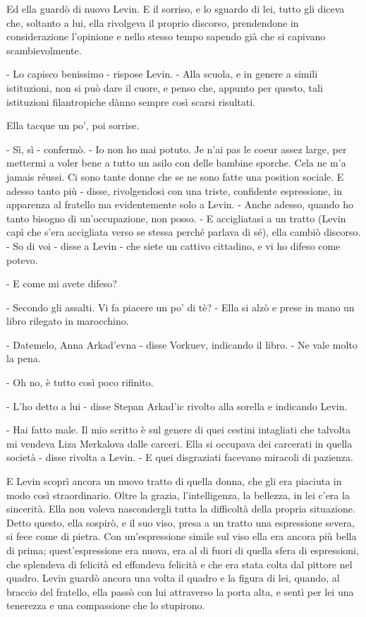 Ed ella guardò di nuovo Levin. E il sorriso, e lo sguardo di lei, tutto gli diceva che, soltanto a lui, ella rivolgeva il proprio discorso, prendendone in considerazione l'opinione e nello stesso tempo sapendo già che si capivano scambievolmente. 

- Lo capisco benissimo - rispose Levin. - Alla scuola, e in genere a simili istituzioni, non si può dare il cuore, e penso che, appunto per questo, tali istituzioni filantropiche dànno sempre così scarsi risultati. 

Ella tacque un po', poi sorrise. 

- Sì, sì - confermò. - Io non ho mai potuto. Je n'ai pas le coeur assez large, per mettermi a voler bene a tutto un asilo con delle bambine sporche. Cela ne m'a jamais réussi. Ci sono tante donne che se ne sono fatte una position sociale. E adesso tanto più - disse, rivolgendosi con una triste, confidente espressione, in apparenza al fratello ma evidentemente solo a Levin. - Anche adesso, quando ho tanto bisogno di un'occupazione, non posso. - E accigliatasi a un tratto (Levin capì che s'era accigliata verso se stessa perché parlava di sé), ella cambiò discorso. - So di voi - disse a Levin - che siete un cattivo cittadino, e vi ho difeso come potevo. 

- E come mi avete difeso? 

- Secondo gli assalti. Vi fa piacere un po' di tè? - Ella si alzò e prese in mano un libro rilegato in marocchino. 

- Datemelo, Anna Arkad'evna - disse Vorkuev, indicando il libro. - Ne vale molto la pena. 

- Oh no, è tutto così poco rifinito. 

- L'ho detto a lui - disse Stepan Arkad'ic rivolto alla sorella e indicando Levin. 

- Hai fatto male. Il mio scritto è sul genere di quei cestini intagliati che talvolta mi vendeva Liza Merkalova dalle carceri. Ella si occupava dei carcerati in quella società - disse rivolta a Levin. - E quei disgraziati facevano miracoli di pazienza. 

E Levin scoprì ancora un nuovo tratto di quella donna, che gli era piaciuta in modo così straordinario. Oltre la grazia, l'intelligenza, la bellezza, in lei c'era la sincerità. Ella non voleva nascondergli tutta la difficoltà della propria situazione. Detto questo, ella sospirò, e il suo viso, presa a un tratto una espressione severa, si fece come di pietra. Con un'espressione simile sul viso ella era ancora più bella di prima; quest'espressione era nuova, era al di fuori di quella sfera di espressioni, che splendeva di felicità ed effondeva felicità e che era stata colta dal pittore nel quadro. Levin guardò ancora una volta il quadro e la figura di lei, quando, al braccio del fratello, ella passò con lui attraverso la porta alta, e sentì per lei una tenerezza e una compassione che lo stupirono. 

